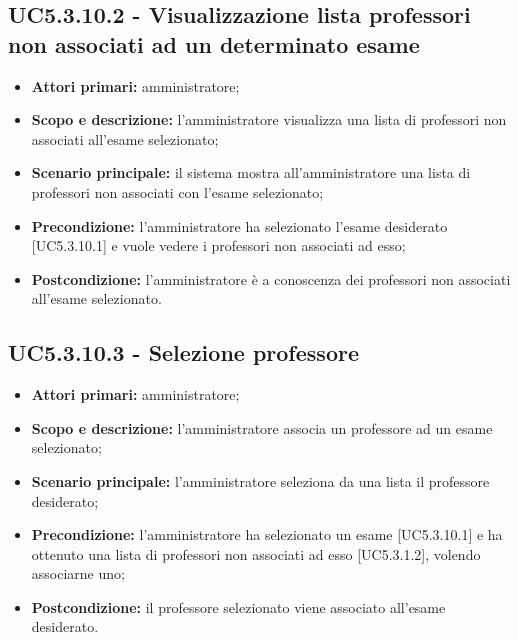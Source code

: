 \documentclass[AnalisiDeiRequisiti.tex]{subfiles}
\begin{document}
\subsection{UC5.3.10.2 - Visualizzazione lista professori non associati ad un determinato esame}
\begin{itemize}
	\item \textbf{Attori primari:} amministratore;
	\item \textbf{Scopo e descrizione:} l'amministratore visualizza una lista di professori non associati all'esame selezionato;
	\item \textbf{Scenario principale:} il sistema mostra all'amministratore una lista di professori non associati con l'esame selezionato;
	\item \textbf{Precondizione:} l'amministratore ha selezionato l'esame desiderato [UC5.3.10.1] e vuole vedere i professori non associati ad esso;  
	\item \textbf{Postcondizione:} l'amministratore è a conoscenza dei professori non associati all'esame selezionato.
\end{itemize}
\subsection{UC5.3.10.3 - Selezione professore}
\begin{itemize}
	\item \textbf{Attori primari:} amministratore;
	\item \textbf{Scopo e descrizione:} l'amministratore associa un professore ad un esame selezionato;
	\item \textbf{Scenario principale:} l'amministratore seleziona da una lista il professore desiderato;
	\item \textbf{Precondizione:} l'amministratore ha selezionato un esame [UC5.3.10.1] e ha ottenuto una lista di professori non associati ad esso [UC5.3.1.2], volendo associarne uno; 
	\item \textbf{Postcondizione:} il professore selezionato viene associato all'esame desiderato.
\end{itemize}
\end{document}
